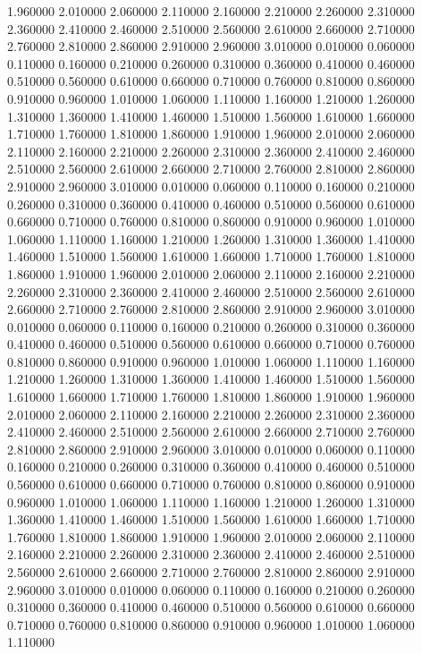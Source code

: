 1.960000
2.010000
2.060000
2.110000
2.160000
2.210000
2.260000
2.310000
2.360000
2.410000
2.460000
2.510000
2.560000
2.610000
2.660000
2.710000
2.760000
2.810000
2.860000
2.910000
2.960000
3.010000
0.010000
0.060000
0.110000
0.160000
0.210000
0.260000
0.310000
0.360000
0.410000
0.460000
0.510000
0.560000
0.610000
0.660000
0.710000
0.760000
0.810000
0.860000
0.910000
0.960000
1.010000
1.060000
1.110000
1.160000
1.210000
1.260000
1.310000
1.360000
1.410000
1.460000
1.510000
1.560000
1.610000
1.660000
1.710000
1.760000
1.810000
1.860000
1.910000
1.960000
2.010000
2.060000
2.110000
2.160000
2.210000
2.260000
2.310000
2.360000
2.410000
2.460000
2.510000
2.560000
2.610000
2.660000
2.710000
2.760000
2.810000
2.860000
2.910000
2.960000
3.010000
0.010000
0.060000
0.110000
0.160000
0.210000
0.260000
0.310000
0.360000
0.410000
0.460000
0.510000
0.560000
0.610000
0.660000
0.710000
0.760000
0.810000
0.860000
0.910000
0.960000
1.010000
1.060000
1.110000
1.160000
1.210000
1.260000
1.310000
1.360000
1.410000
1.460000
1.510000
1.560000
1.610000
1.660000
1.710000
1.760000
1.810000
1.860000
1.910000
1.960000
2.010000
2.060000
2.110000
2.160000
2.210000
2.260000
2.310000
2.360000
2.410000
2.460000
2.510000
2.560000
2.610000
2.660000
2.710000
2.760000
2.810000
2.860000
2.910000
2.960000
3.010000
0.010000
0.060000
0.110000
0.160000
0.210000
0.260000
0.310000
0.360000
0.410000
0.460000
0.510000
0.560000
0.610000
0.660000
0.710000
0.760000
0.810000
0.860000
0.910000
0.960000
1.010000
1.060000
1.110000
1.160000
1.210000
1.260000
1.310000
1.360000
1.410000
1.460000
1.510000
1.560000
1.610000
1.660000
1.710000
1.760000
1.810000
1.860000
1.910000
1.960000
2.010000
2.060000
2.110000
2.160000
2.210000
2.260000
2.310000
2.360000
2.410000
2.460000
2.510000
2.560000
2.610000
2.660000
2.710000
2.760000
2.810000
2.860000
2.910000
2.960000
3.010000
0.010000
0.060000
0.110000
0.160000
0.210000
0.260000
0.310000
0.360000
0.410000
0.460000
0.510000
0.560000
0.610000
0.660000
0.710000
0.760000
0.810000
0.860000
0.910000
0.960000
1.010000
1.060000
1.110000
1.160000
1.210000
1.260000
1.310000
1.360000
1.410000
1.460000
1.510000
1.560000
1.610000
1.660000
1.710000
1.760000
1.810000
1.860000
1.910000
1.960000
2.010000
2.060000
2.110000
2.160000
2.210000
2.260000
2.310000
2.360000
2.410000
2.460000
2.510000
2.560000
2.610000
2.660000
2.710000
2.760000
2.810000
2.860000
2.910000
2.960000
3.010000
0.010000
0.060000
0.110000
0.160000
0.210000
0.260000
0.310000
0.360000
0.410000
0.460000
0.510000
0.560000
0.610000
0.660000
0.710000
0.760000
0.810000
0.860000
0.910000
0.960000
1.010000
1.060000
1.110000
